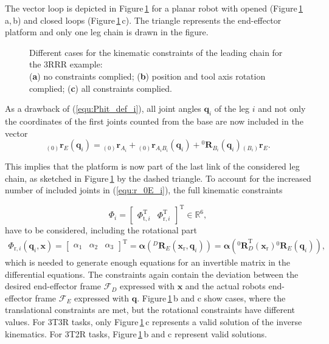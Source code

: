 \documentclass[robotics,article,accept,moreauthors,pdftex]{Definitions/mdpi}
\newcommand{\bm}[1]{\boldsymbol{#1}}
\newcommand{\ortvek}[4]{{ }_{(#1)}{\boldsymbol{#2}}^{#3}_{#4} }
\newcommand{\rotmat}[2]{{{ }^{#1}\boldsymbol{R}}_{#2}}
\newcommand{\transp}[0]{{\mathrm{T}}}
\newcommand{\ks}[1]{{\mathcal{F}}_{#1}}
\let\Phi\varPhi
\begin{document}
The vector loop is depicted in Figure\,\ref{fig:pkm_constr_rot_lead} for a planar robot with opened (Figure\,\ref{fig:pkm_constr_rot_lead}\,a,\,b) and closed loops (Figure\,\ref{fig:pkm_constr_rot_lead}\,c).
The triangle represents the end-effector platform and only one leg chain is drawn in the figure.
%
\begin{figure}[b]
	
	\caption{Different cases for the kinematic constraints of the leading chain for the 3RRR example:\\(\textbf{a}) no constraints complied; (\textbf{b}) position and tool axis rotation complied; (\textbf{c}) all constraints complied.}
	\label{fig:pkm_constr_rot_lead}
\end{figure} 

As a drawback of (\ref{equ:Phit_def_i}), all joint angles $\bm{q}_i$ of the leg $i$ and not only the coordinates of the first joints counted from the base are now included in the vector
%
\begin{equation}
\ortvek{0}{r}{}{E}(\bm{q}_i) = 
\ortvek{0}{r}{}{A_i}
+ \ortvek{0}{r}{}{A_iB_i}(\bm{q}_i) + \rotmat{0}{B_i}(\bm{q}_i) \ortvek{B_i}{r}{}{E}.
\label{equ:r_0E_i}
\end{equation}
%

This implies that the platform is now part of the last link of the considered leg chain, as sketched in Figure\,\ref{fig:pkm_constr_rot_lead} by the dashed triangle.
To account for the increased number of included joints in (\ref{equ:r_0E_i}), the full kinematic constraints
\vspace{-0.6cm} %

\begin{equation}
\bm{\Phi}_i=\begin{bmatrix}
\bm{\Phi}_{\mathrm{t},i}^\transp & \bm{\Phi}_{\mathrm{r},i}^\transp
\end{bmatrix}^\transp \in {\mathbb{R}}^{6},
\label{equ:Phi_def}
\end{equation}
%
have to be considered, including the rotational part
%
\begin{align}
\bm{\Phi}_{\mathrm{r},i}(\bm{q}_i,\bm{x})
=
\begin{bmatrix}
\alpha_1 & \alpha_2 & \alpha_3
\end{bmatrix}^\transp
=
\bm{\alpha}\left(\rotmat{D}{E}(\bm{x}_{\mathrm{r}},\bm{q}_i)\right)
=
\bm{\alpha}\left(\rotmat{0}{D}^\transp (\bm{x}_{\mathrm{r}})\rotmat{0}{E}(\bm{q}_i)\right),
\label{equ:Phir_def_i}
\end{align}
%
which is needed to generate enough equations for an invertible matrix in the differential equations.
The constraints again contain the deviation between the desired end-effector frame $\ks{D}$ expressed with $\bm{x}$ and the actual robots end-effector frame $\ks{E}$ expressed with $\bm{q}$.
Figure\,\ref{fig:pkm_constr_rot_lead}\,b and c show cases, where the translational constraints are met, but the rotational constraints have different values.
For 3T3R tasks, only Figure\,\ref{fig:pkm_constr_rot_lead}\,c represents a valid solution of the inverse kinematics. For 3T2R tasks, \linebreak Figure\,\ref{fig:pkm_constr_rot_lead}\,b and c represent valid solutions.
\end{document}
